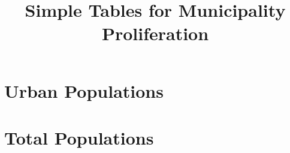 \documentclass{article}
\title{Simple Tables for Municipality Proliferation}
\begin{document}
\maketitle
\tableofcontents
{\footnotesize 
\listoffigures
\listoftables}
\clearpage

\section{Urban Populations}

\clearpage
\begin{landscape}

\clearpage

\clearpage
\end{landscape}

\section{Total Populations}

\clearpage
\begin{landscape}

\clearpage

\clearpage
\end{landscape}
\end{document}
